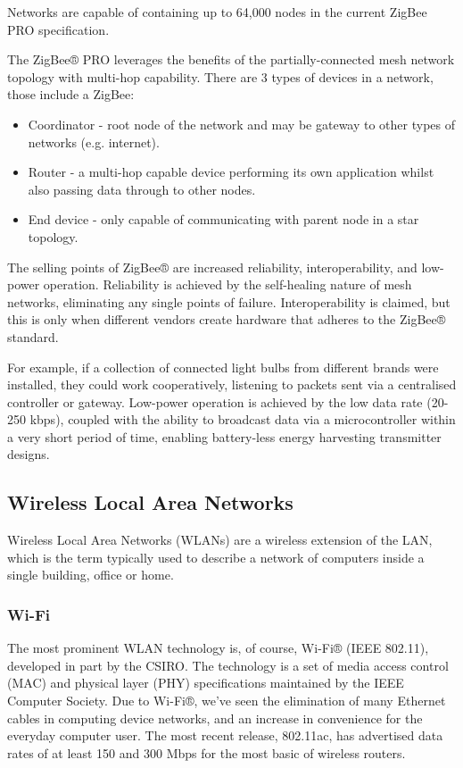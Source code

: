 Networks are capable of containing up to 64,000 nodes in the current ZigBee PRO specification.

The ZigBee® PRO leverages the benefits of the partially-connected mesh network topology with multi-hop capability. There are 3 types of devices in a network, those include a ZigBee:

\begin{itemize}
    \item Coordinator - root node of the network and may be gateway to other types of networks (e.g. internet).
    \item Router - a multi-hop capable device performing its own application whilst also passing data through to other nodes.
    \item  End device - only capable of communicating with parent node in a star topology.
\end{itemize}

The selling points of ZigBee® are increased reliability, interoperability, and low-power operation. Reliability is achieved by the self-healing nature of mesh networks, eliminating any single points of failure. Interoperability is claimed, but this is only when different vendors create hardware that adheres to the ZigBee® standard.

For example, if a collection of connected light bulbs from different brands were installed, they could work cooperatively, listening to packets sent via a centralised controller or gateway. Low-power operation is achieved by the low data rate (20-250 kbps), coupled with the ability to broadcast data via a microcontroller within a very short period of time, enabling battery-less energy harvesting transmitter designs.

\subsection{Wireless Local Area Networks}

Wireless Local Area Networks (WLANs) are a wireless extension of the LAN, which is the term typically used to describe a network of computers inside a single building, office or home.

\subsubsection{Wi-Fi}

The most prominent WLAN technology is, of course, Wi-Fi® (IEEE 802.11), developed in part by the CSIRO. The technology is a set of media access control (MAC) and physical layer (PHY) specifications maintained by the IEEE Computer Society. Due to Wi-Fi®, we’ve seen the elimination of many Ethernet cables in computing device networks, and an increase in convenience for the everyday computer user. The most recent release, 802.11ac, has advertised data rates of at least 150 and 300 Mbps for the most basic of wireless routers.

